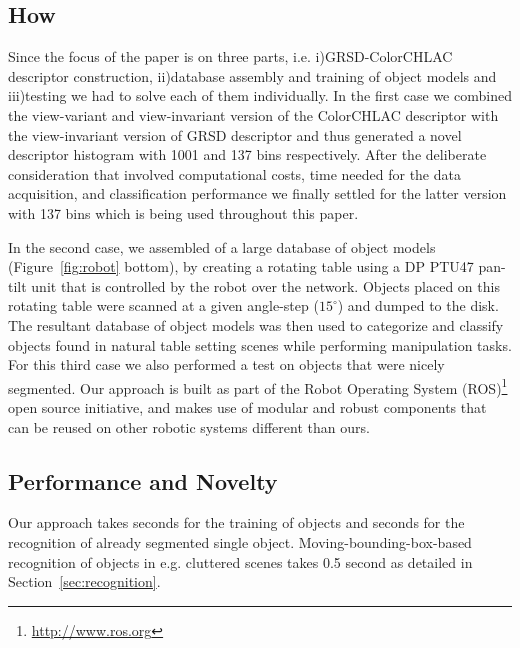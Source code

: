\documentclass[conference]{sty/IEEEtran}
\begin{document}
\subsection{How}
Since the focus of the paper is on three parts, i.e. i)GRSD-ColorCHLAC descriptor
construction, ii)database assembly and training of object models and iii)testing
we had to solve each of them individually. In the first case we combined
the view-variant and view-invariant version of the ColorCHLAC descriptor with the
view-invariant version of GRSD descriptor and thus generated a novel descriptor
histogram with 1001 and 137 bins respectively. After the deliberate consideration
that involved computational costs, time needed for the data acquisition, and
classification performance we finally settled for the latter version with 137
bins which is being used throughout this paper.

In the second case, we assembled of a large database of
object models (Figure~\ref{fig:robot} bottom), by creating a rotating
table using a DP PTU47 pan-tilt unit that is controlled by the robot over the
network.  Objects placed on this rotating table were scanned at a given
angle-step ($15^\circ$) and dumped to the disk. The resultant database of
object models was then used to categorize and classify objects found in
natural table setting scenes while performing manipulation
tasks.  For this third case we also performed a test on objects that were
nicely segmented. Our approach is built as part of the Robot Operating System
(ROS)\footnote{\url{http://www.ros.org}} open source initiative, and makes
use of modular and robust components that can be reused on other robotic
systems different than ours.



\subsection{Performance and Novelty}
Our approach takes  seconds for the training of objects and  seconds
for the recognition of already segmented single object. Moving-bounding-box-based
recognition of objects in e.g. cluttered scenes takes 0.5 second as detailed
in Section~\ref{sec:recognition}.
\end{document}
